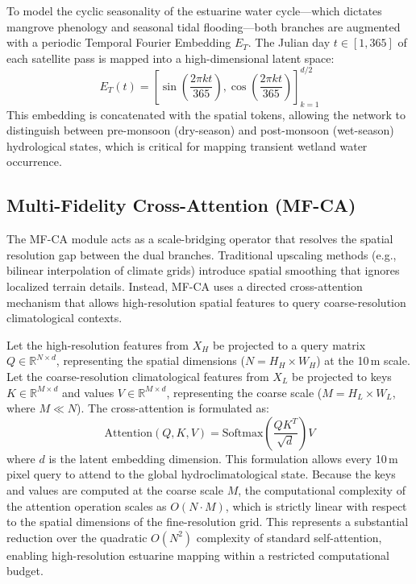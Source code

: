 \documentclass[preprint,12pt]{elsarticle}
\begin{document}
To model the cyclic seasonality of the estuarine water cycle---which dictates mangrove phenology and seasonal tidal flooding---both branches are augmented with a periodic Temporal Fourier Embedding $E_T$. The Julian day $t \in [1, 365]$ of each satellite pass is mapped into a high-dimensional latent space:
\begin{equation}
E_T(t) = \left[ \sin\left(\frac{2\pi k t}{365}\right), \cos\left(\frac{2\pi k t}{365}\right) \right]_{k=1}^{d/2}
\end{equation}
This embedding is concatenated with the spatial tokens, allowing the network to distinguish between pre-monsoon (dry-season) and post-monsoon (wet-season) hydrological states, which is critical for mapping transient wetland water occurrence.

\subsection{Multi-Fidelity Cross-Attention (MF-CA)}
The MF-CA module acts as a scale-bridging operator that resolves the spatial resolution gap between the dual branches. Traditional upscaling methods (e.g., bilinear interpolation of climate grids) introduce spatial smoothing that ignores localized terrain details. Instead, MF-CA uses a directed cross-attention mechanism that allows high-resolution spatial features to query coarse-resolution climatological contexts.

Let the high-resolution features from $X_H$ be projected to a query matrix $Q \in \mathbb{R}^{N \times d}$, representing the spatial dimensions ($N = H_H \times W_H$) at the 10\,m scale. Let the coarse-resolution climatological features from $X_L$ be projected to keys $K \in \mathbb{R}^{M \times d}$ and values $V \in \mathbb{R}^{M \times d}$, representing the coarse scale ($M = H_L \times W_L$, where $M \ll N$). The cross-attention is formulated as:
\begin{equation}
\text{Attention}(Q, K, V) = \text{Softmax}\left(\frac{QK^T}{\sqrt{d}}\right)V
\end{equation}
where $d$ is the latent embedding dimension. This formulation allows every 10\,m pixel query to attend to the global hydroclimatological state. Because the keys and values are computed at the coarse scale $M$, the computational complexity of the attention operation scales as $O(N \cdot M)$, which is strictly linear with respect to the spatial dimensions of the fine-resolution grid. This represents a substantial reduction over the quadratic $O(N^2)$ complexity of standard self-attention, enabling high-resolution estuarine mapping within a restricted computational budget.
\end{document}
